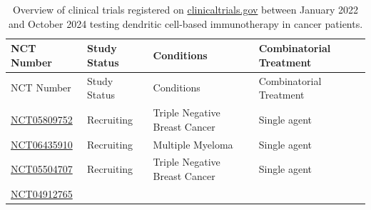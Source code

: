 \documentclass[
]{article}
\begin{document}
\begin{longtable}[]{@{}
  >{\raggedright\arraybackslash}p{}
  >{\raggedright\arraybackslash}p{}
  >{\raggedright\arraybackslash}p{}
  >{\raggedright\arraybackslash}p{}@{}}
\caption{Overview of clinical trials registered on
\href{https://www.clinicaltrials.gov/}{clinicaltrials.gov} between
January 2022 and October 2024 testing dendritic cell-based immunotherapy
in cancer patients.}\label{tbl-clin}\tabularnewline
\toprule\noalign{}
\begin{minipage}[b]{\linewidth}\raggedright
NCT Number
\end{minipage} & \begin{minipage}[b]{\linewidth}\raggedright
Study Status
\end{minipage} & \begin{minipage}[b]{\linewidth}\raggedright
Conditions
\end{minipage} & \begin{minipage}[b]{\linewidth}\raggedright
Combinatorial Treatment
\end{minipage} \\
\midrule\noalign{}
\endfirsthead
\toprule\noalign{}
\begin{minipage}[b]{\linewidth}\raggedright
NCT Number
\end{minipage} & \begin{minipage}[b]{\linewidth}\raggedright
Study Status
\end{minipage} & \begin{minipage}[b]{\linewidth}\raggedright
Conditions
\end{minipage} & \begin{minipage}[b]{\linewidth}\raggedright
Combinatorial Treatment
\end{minipage} \\
\midrule\noalign{}
\endhead
\bottomrule\noalign{}
\endlastfoot
\href{https://clinicaltrials.gov/study/NCT05809752}{NCT05809752} &
Recruiting & Triple Negative Breast Cancer & Single agent \\
\href{https://clinicaltrials.gov/study/NCT06435910}{NCT06435910} &
Recruiting & Multiple Myeloma & Single agent \\
\href{https://clinicaltrials.gov/study/NCT05504707}{NCT05504707} &
Recruiting & Triple Negative Breast Cancer & Single agent \\
\href{https://clinicaltrials.gov/study/NCT04912765}{NCT04912765} &

\end{longtable}
\end{document}

